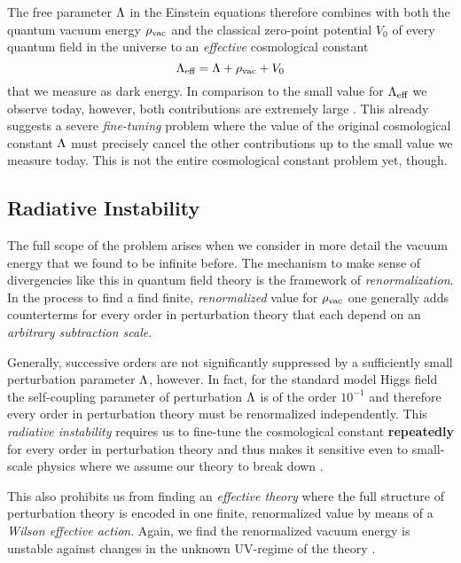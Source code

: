 \documentclass[parskip=half]{scrreprt}
\begin{document}
The free parameter \(\Lambda\) in the Einstein equations therefore combines with both the quantum vacuum energy \(\rho_\textnormal{vac}\) and the classical zero-point potential \(V_0\) of every quantum field in the universe to an \emph{effective} cosmological constant
\begin{equation}
	\Lambda_\textnormal{eff} = \Lambda + \rho_\textnormal{vac} + V_0
\end{equation}
that we measure as dark energy. In comparison to the small value for \(\Lambda_\textnormal{eff}\) we observe today, however, both contributions are extremely large \citep{Martin2012}.  This already suggests a severe \emph{fine-tuning} problem where the value of the original cosmological constant \(\Lambda\) must precisely cancel the other contributions up to the small value we measure today.  This is not the entire cosmological constant problem yet, though.

\subsection{Radiative Instability}\label{sec:rad_instability}

The full scope of the problem arises when we consider in more detail the vacuum energy that we found to be infinite before. The mechanism to make sense of divergencies like this in quantum field theory is the framework of \emph{renormalization}. In the process to find a find finite, \emph{renormalized} value for \(\rho_\textnormal{vac}\) one generally adds counterterms for every order in perturbation theory that each depend on an \emph{arbitrary subtraction scale}.

Generally, successive orders are not significantly suppressed by a sufficiently small perturbation parameter \(\Lambda\), however. In fact, for the standard model Higgs field the self-coupling parameter of perturbation \(\Lambda\) is of the order \(10^{-1}\)  and therefore every order in perturbation theory must be renormalized independently. This \emph{radiative instability} requires us to fine-tune the cosmological constant \textbf{repeatedly} for every order in perturbation theory and thus makes it sensitive even to small-scale physics where we assume our theory to break down \citep{Datta1996}.

This also prohibits us from finding an \emph{effective theory} where the full structure of perturbation theory is encoded in one finite, renormalized value by means of a \emph{Wilson effective action}.  Again, we find the renormalized vacuum energy is unstable against changes in the unknown UV-regime of the theory \citep{Datta1996}.
\end{document}

